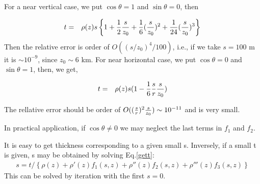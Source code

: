 For a near vertical case, we put $\cos\theta=1$ and  $\sin\theta=0$, then

\begin{eqnarray}
t&=&\rho(z)s\left\{ 1 + {1 \over 2}{s\over z_0}
 +{1 \over 6}({s\over z_0})^2 +{1 \over 24}({s\over z_0})^3 \right\}
\end{eqnarray}
Then the relative error is order of $O((s/z_0)^4/100)$, i.e., if we take $s=100$ m
it is $\sim 10^{-9}$, since $z_0\sim 6$ km. For near horizontal case,
we put $\cos\theta= 0$ and  $\sin\theta = 1$, then, we get,

\begin{eqnarray}
t&=&\rho(z)s(1 -{1 \over 6}{s\over r}{ s\over z_0})
\end{eqnarray}

The rellative error should be order of $O(({ s\over r})^2{s \over z_0})\sim 10^{-11}$ and is very small.

In practical application,  if $\cos\theta\neq0$ we may 
neglect the last terms in $f_1$ and $f_2$.

It is easy to get  thickness corresponding to a given small
s.  Inversely, if a small t is given, s may be obtained by 
solving Eq.\ref{gett}:  
\begin{eqnarray}\label{gets}
s=t/ \left\{  \rho(z) + \rho'(z)f_1(s,z)+\rho''(z)f_2(s,z)+\rho'''(z)f_3(s,z) \right\}
\end{eqnarray}
This can be solved by iteration with the first $s=0$.


